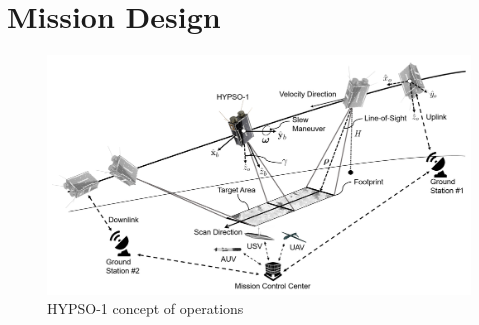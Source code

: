 \section{Mission Design}
\label{sec:mission-design}
\begin{figure}[htbp]
  \begin{center}
    \includegraphics[width=160mm,angle=0]{figs/CONCEPT_HYPSO1.png}
    \caption{HYPSO-1 concept of operations}
    \label{fig:conops}
\end{center}
\end{figure}
